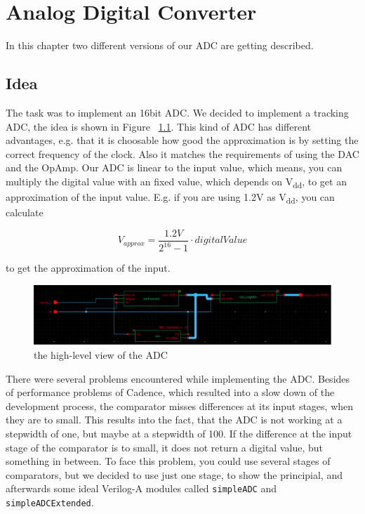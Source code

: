 \chapter{Analog Digital Converter}

In this chapter two different versions of our ADC are getting described.

\section{Idea}

The task was to implement an 16bit ADC. We decided to implement a tracking ADC, the idea is shown in Figure ~\ref{fig:wholeADC}. This kind of ADC has different advantages, e.g. that it is choosable how good the approximation is by setting the correct frequency of the clock. Also it matches the requirements of using the DAC and the OpAmp. Our ADC is linear to the input value, which means, you can multiply the digital value with an fixed value, which depends on V\textsubscript{dd}, to get an approximation of the input value. E.g. if you are using 1.2V as V\textsubscript{dd}, you can calculate 

\begin{equation}
	V_{approx} = \frac{1.2V}{2^{16} - 1} \cdot digitalValue
\end{equation}

to get the approximation of the input.

\begin{figure}[h]
	\centering
	\includegraphics[scale=0.5]{images/adc/adc.png}
	\caption{the high-level view of the ADC}
	\label{fig:wholeADC}
\end{figure} 

There were several problems encountered while implementing the ADC. Besides of performance problems of Cadence, which resulted into a slow down of the development process, the comparator misses differences at its input stages, when they are to small. This results into the fact, that the ADC is not working at a stepwidth of one, but maybe at a stepwidth of 100. If the difference at the input stage of the comparator is to small, it does not return a digital value, but something in between. To face this problem, you could use several stages of comparators, but we decided to use just one stage, to show the principial, and afterwards some ideal Verilog-A modules called \texttt{simpleADC} and \texttt{simpleADCExtended}. 

